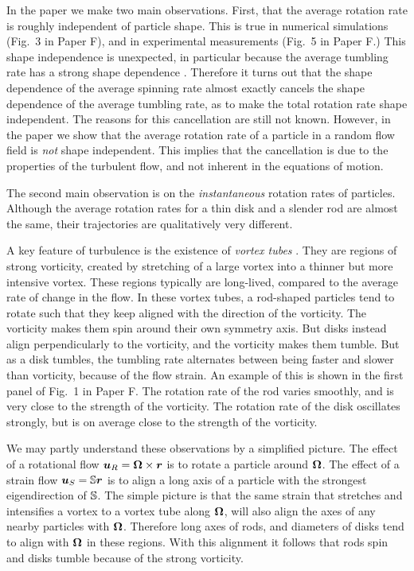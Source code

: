 \documentclass[thesis.tex]{subfiles}
\begin{document}
In the paper we make two main observations. First, that the average rotation rate is roughly independent of particle shape. This is true in numerical simulations (Fig.~3 in Paper F), and in experimental measurements (Fig.~5 in Paper F.) This shape independence is unexpected, in particular because the average tumbling rate has a strong shape dependence \cite{parsa2012,gustavsson2014}. Therefore it turns out that the shape dependence of the average spinning rate almost exactly cancels the shape dependence of the average tumbling rate, as to make the total rotation rate shape independent. The reasons for this cancellation are still not known. However, in the paper we show that the average rotation rate of a particle in a random flow field is \emph{not} shape independent. This implies that the cancellation is due to the properties of the turbulent flow, and not inherent in the equations of motion.

The second main observation is on the \emph{instantaneous} rotation rates of particles. Although the average rotation rates for a thin disk and a slender rod are almost the same, their trajectories are qualitatively very different.

A key feature of turbulence is the existence of \emph{vortex tubes} \cite{she1990}. They are regions of strong vorticity, created by stretching of a large vortex into a thinner but more intensive vortex. These regions typically are long-lived, compared to the average rate of change in the flow. In these vortex tubes, a rod-shaped particles tend to rotate such that they keep aligned with the direction of the vorticity. The vorticity makes them spin around their own symmetry axis. But disks instead align perpendicularly to the vorticity, and the vorticity makes them tumble. But as a disk tumbles, the tumbling rate alternates between being faster and slower than vorticity, because of the flow strain. An example of this is shown in the first panel of Fig.~1 in Paper F. The rotation rate of the rod varies smoothly, and is very close to the strength of the vorticity. The rotation rate of the disk oscillates strongly, but is on average close to the strength of the vorticity.

We may partly understand these observations by a simplified picture. The effect of a rotational flow $\mbox{\boldmath$u$}_R= \mbox{\boldmath$\Omega$} \times \mbox{\boldmath$r$}$ is to rotate a particle around $\mbox{\boldmath$\Omega$}$. The effect of a strain flow $\mbox{\boldmath$u$}_S=\mathbb{S} \mbox{\boldmath$r$}$ is to align a long axis of a particle with the strongest eigendirection of $\mathbb{S}$. The simple picture is that the same strain that stretches and intensifies a vortex to a vortex tube along $\mbox{\boldmath$\Omega$}$, will also align the axes of any nearby particles with $\mbox{\boldmath$\Omega$}$. Therefore long axes of rods, and diameters of disks tend to align with $\mbox{\boldmath$\Omega$}$ in these regions. With this alignment it follows that rods spin and disks tumble because of the strong vorticity.
\end{document}
